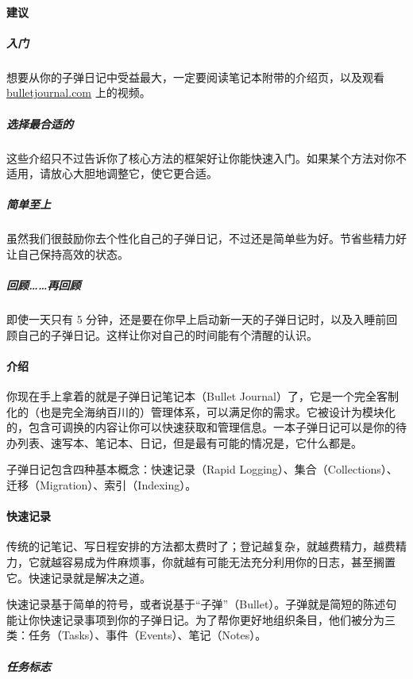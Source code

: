 \documentclass[a5paper]{article}
\begin{document}
\paragraph{建议}

\subparagraph{入门}

想要从你的子弹日记中受益最大，一定要阅读笔记本附带的介绍页，以及观看 \href{http://bulletjournal.com}{bulletjournal.com} 上的视频。

\subparagraph{选择最合适的}

这些介绍只不过告诉你了核心方法的框架好让你能快速入门。如果某个方法对你不适用，请放心大胆地调整它，使它更合适。

\subparagraph{简单至上}

虽然我们很鼓励你去个性化自己的子弹日记，不过还是简单些为好。节省些精力好让自己保持高效的状态。

\subparagraph{回顾……再回顾}

即使一天只有 5 分钟，还是要在你早上启动新一天的子弹日记时，以及入睡前回顾自己的子弹日记。这样让你对自己的时间能有个清醒的认识。

\clearpage

\paragraph{介绍}

你现在手上拿着的就是子弹日记笔记本（Bullet Journal）了，它是一个完全客制化的（也是完全海纳百川的）管理体系，可以满足你的需求。它被设计为模块化的，包含可调换的内容让你可以快速获取和管理信息。一本子弹日记可以是你的待办列表、速写本、笔记本、日记，但是最有可能的情况是，它什么都是。

子弹日记包含四种基本概念：快速记录（Rapid Logging）、集合（Collections）、迁移（Migration）、索引（Indexing）。

\clearpage

\paragraph{快速记录}

传统的记笔记、写日程安排的方法都太费时了；登记越复杂，就越费精力，越费精力，它就越容易成为件麻烦事，你就越有可能无法充分利用你的日志，甚至搁置它。快速记录就是解决之道。

快速记录基于简单的符号，或者说基于“子弹”（Bullet）。子弹就是简短的陈述句能让你快速记录事项到你的子弹日记。为了帮你更好地组织条目，他们被分为三类：任务（Tasks）、事件（Events）、笔记（Notes）。

\subparagraph{任务标志}
\end{document}
